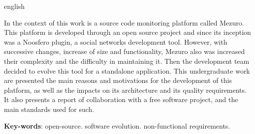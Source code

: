 \begin{resumo}[Abstract]
  \begin{otherlanguage*}{english} 
  
In the context of this work is a source code monitoring platform called Mezuro. This platform is developed through an open source project and since its inception was a Noosfero plugin, a social networks development tool.
%
However, with successive changes, increase of size and functionality, Mezuro also was increased their complexity and the difficulty in maintaining it. Then the development team decided to evolve this tool for a standalone application.
%
This undergraduate work are presented the main reasons and motivations for the development of this platform, as well as the impacts on its architecture and its quality requirements.
%
It also presents a report of collaboration with a free software project, and the main standards used for such.
  
  \vspace{\onelineskip}
 
  \noindent 
  \textbf{Key-words}: open-source. software evolution. non-functional requirements.
  \end{otherlanguage*}
\end{resumo}


